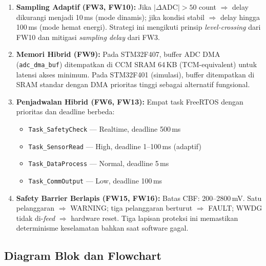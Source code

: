 \documentclass[12pt,a4paper]{article}
\begin{document}
\begin{enumerate}
    \item \textbf{Sampling Adaptif (FW3, FW10):}
    Jika $|\Delta\mathrm{ADC}| > 50$ count $\Rightarrow$ delay dikurangi menjadi 10\,ms (mode dinamis); jika kondisi stabil $\Rightarrow$ delay hingga 100\,ms (mode hemat energi). Strategi ini mengikuti prinsip \textit{level-crossing} dari FW10 dan mitigasi \textit{sampling delay} dari FW3.

    \item \textbf{Memori Hibrid (FW9):}
    Pada STM32F407, buffer ADC DMA (\texttt{adc\_dma\_buf}) ditempatkan di CCM SRAM 64\,KB (TCM-equivalent) untuk latensi akses minimum. Pada STM32F401 (simulasi), buffer ditempatkan di SRAM standar dengan DMA prioritas tinggi sebagai alternatif fungsional.

    \item \textbf{Penjadwalan Hibrid (FW6, FW13):}
    Empat task FreeRTOS dengan prioritas dan deadline berbeda:
    \begin{itemize}
        \item \texttt{Task\_SafetyCheck} --- Realtime, deadline 500\,ms
        \item \texttt{Task\_SensorRead} --- High, deadline 1--100\,ms (adaptif)
        \item \texttt{Task\_DataProcess} --- Normal, deadline 5\,ms
        \item \texttt{Task\_CommOutput} --- Low, deadline 100\,ms
    \end{itemize}

    \item \textbf{Safety Barrier Berlapis (FW15, FW16):}
    Batas CBF: 200--2800\,mV. Satu pelanggaran $\Rightarrow$ WARNING; tiga pelanggaran berturut $\Rightarrow$ FAULT; WWDG tidak di-\textit{feed} $\Rightarrow$ hardware reset. Tiga lapisan proteksi ini memastikan determinisme keselamatan bahkan saat software gagal.
\end{enumerate}

\subsection{Diagram Blok dan Flowchart}
\end{document}
